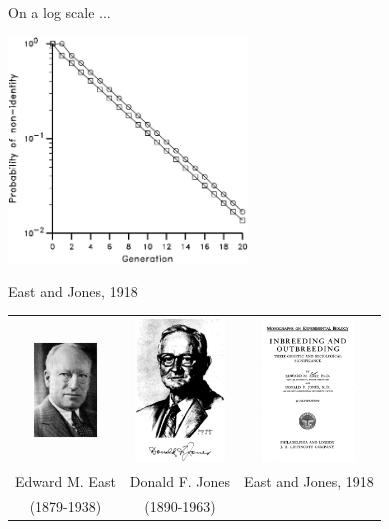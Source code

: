 \documentclass[bluish,slideColor,colorBG,pdf]{prosper}
\begin{document}
\begin{slide}[Replace]{On a log scale ... }

\centerline{\includegraphics[width=2.5in]{fig5-9a.ps}}

\end{slide}

\begin{slide}[Replace]{East and Jones, 1918}

\begin{center}
\begin{tabular}{c c c}
\includegraphics[height=1.0in]{EdwardMEast.ps}  &
\includegraphics[height=1.5in]{DonaldFJones.ps} &
\includegraphics[height=1.5in]{EastJones1918.ps} \\
Edward M. East & Donald F. Jones & East and Jones, 1918\\
(1879-1938) & (1890-1963) &  
\end{tabular}
\end{center}

\end{slide}
\end{document}
